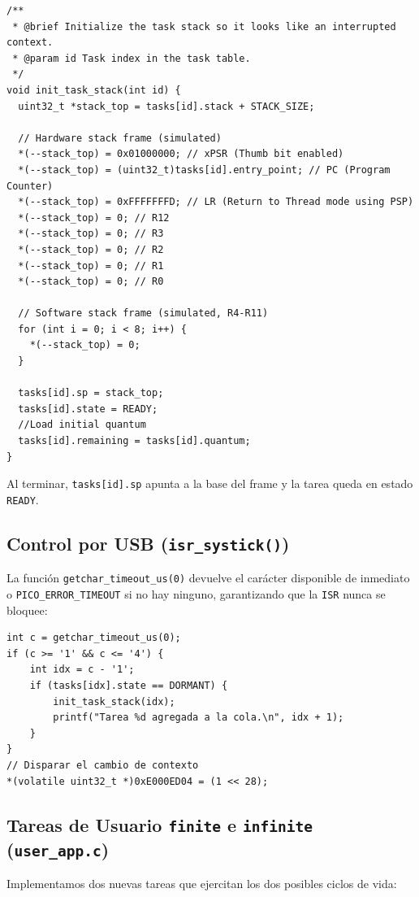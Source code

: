 \documentclass[12pt,letterpaper]{article}
\begin{document}
\begin{lstlisting}[style=modernc, caption={Frame ficticio de hardware en \texttt{init\_task\_stack()}}]
/**
 * @brief Initialize the task stack so it looks like an interrupted context.
 * @param id Task index in the task table.
 */
void init_task_stack(int id) {
  uint32_t *stack_top = tasks[id].stack + STACK_SIZE;
    
  // Hardware stack frame (simulated)
  *(--stack_top) = 0x01000000; // xPSR (Thumb bit enabled)
  *(--stack_top) = (uint32_t)tasks[id].entry_point; // PC (Program Counter)
  *(--stack_top) = 0xFFFFFFFD; // LR (Return to Thread mode using PSP)
  *(--stack_top) = 0; // R12
  *(--stack_top) = 0; // R3
  *(--stack_top) = 0; // R2
  *(--stack_top) = 0; // R1
  *(--stack_top) = 0; // R0

  // Software stack frame (simulated, R4-R11)
  for (int i = 0; i < 8; i++) {
    *(--stack_top) = 0;
  }
    
  tasks[id].sp = stack_top;
  tasks[id].state = READY;
  //Load initial quantum
  tasks[id].remaining = tasks[id].quantum;
}
\end{lstlisting}
 
Al terminar, \texttt{tasks[id].sp} apunta a la base del frame y la tarea queda en estado \texttt{READY}.
 
\subsection*{Control por USB (\texttt{isr\_systick()})}
La función \texttt{getchar\_timeout\_us(0)} devuelve el carácter disponible de inmediato o \texttt{PICO\_ERROR\_TIMEOUT} si no hay ninguno, garantizando que la \texttt{ISR} nunca se bloquee:
 
\begin{lstlisting}[style=modernc, caption={Polling no bloqueante de la UART USB en \texttt{isr\_systick()}}]
int c = getchar_timeout_us(0);
if (c >= '1' && c <= '4') {
    int idx = c - '1';
    if (tasks[idx].state == DORMANT) {
        init_task_stack(idx);
        printf("Tarea %d agregada a la cola.\n", idx + 1);
    }
}
// Disparar el cambio de contexto
*(volatile uint32_t *)0xE000ED04 = (1 << 28);
\end{lstlisting}
 
\subsection*{Tareas de Usuario \texttt{finite} e \texttt{infinite} (\texttt{user\_app.c})}
Implementamos dos nuevas tareas que ejercitan los dos posibles ciclos de vida:
 
\end{document}
